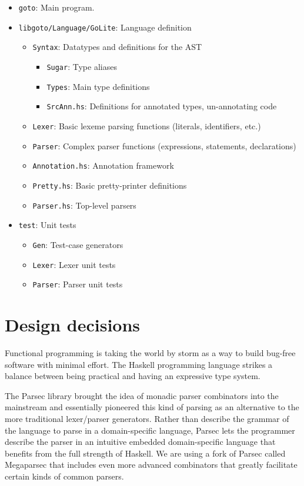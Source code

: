 \documentclass[letterpaper,11pt]{article}
\begin{document}
\begin{itemize}
\item \texttt{goto}: Main program.
\item \texttt{libgoto/Language/GoLite}: Language definition
	\begin{itemize}
	\item \texttt{Syntax}: Datatypes and definitions for the AST
			\begin{itemize}
			\item \texttt{Sugar}: Type aliases
			\item \texttt{Types}: Main type definitions
			\item \texttt{SrcAnn.hs}: Definitions for annotated types, un-annotating code
			\end{itemize}
	\item \texttt{Lexer}: Basic lexeme parsing functions (literals, identifiers, etc.)
	\item \texttt{Parser}: Complex parser functions (expressions, statements, declarations)
	
	\item \texttt{Annotation.hs}: Annotation framework
	\item \texttt{Pretty.hs}: Basic pretty-printer definitions
	\item \texttt{Parser.hs}: Top-level parsers
	
	\end{itemize}
\item \texttt{test}: Unit tests
	\begin{itemize}
	\item \texttt{Gen}: Test-case generators
	\item \texttt{Lexer}: Lexer unit tests
	\item \texttt{Parser}: Parser unit tests
	\end{itemize}

\end{itemize}


\section{Design decisions}

Functional programming is taking the world by storm as a way to build bug-free software with minimal effort. The Haskell programming language strikes a balance between being practical and having an expressive type system.

The Parsec library brought the idea of monadic parser combinators into the mainstream and essentially pioneered this kind of parsing as an alternative to the more traditional lexer/parser generators. Rather than describe the grammar of the language to parse in a domain-specific language, Parsec lets the programmer describe the parser in an intuitive embedded domain-specific language that benefits from the full strength of Haskell. We are using a fork of Parsec called Megaparsec that includes even more advanced combinators that greatly facilitate certain kinds of common parsers.
\end{document}
